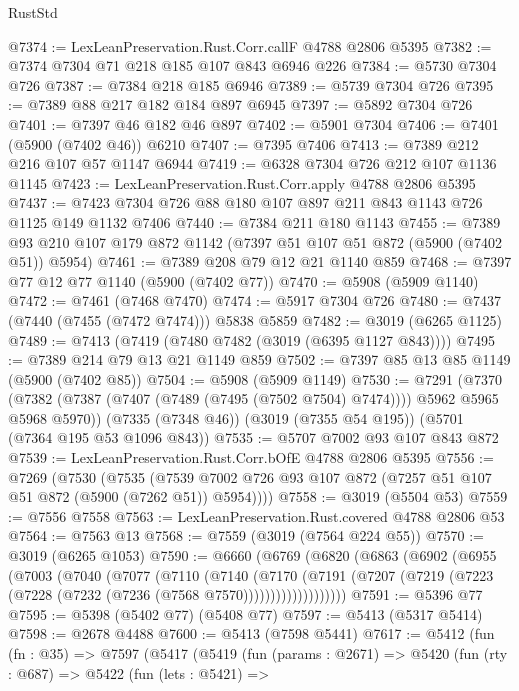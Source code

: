 \begin{lexlean}{RustStd}
\begin{coremodule}
@7374 := LexLeanPreservation.Rust.Corr.callF @4788 @2806 @5395
@7382 := @7374 @7304 @71 @218 @185 @107 @843 @6946 @226
@7384 := @5730 @7304 @726
@7387 := @7384 @218 @185 @6946
@7389 := @5739 @7304 @726
@7395 := @7389 @88 @217 @182 @184 @897 @6945
@7397 := @5892 @7304 @726
@7401 := @7397 @46 @182 @46 @897
@7402 := @5901 @7304
@7406 := @7401 (@5900 (@7402 @46)) @6210
@7407 := @7395 @7406
@7413 := @7389 @212 @216 @107 @57 @1147 @6944
@7419 := @6328 @7304 @726 @212 @107 @1136 @1145
@7423 := LexLeanPreservation.Rust.Corr.apply @4788 @2806 @5395
@7437 := @7423 @7304 @726 @88 @180 @107 @897 @211 @843 @1143 @726 @1125 @149 @1132 @7406
@7440 := @7384 @211 @180 @1143
@7455 := @7389 @93 @210 @107 @179 @872 @1142 (@7397 @51 @107 @51 @872 (@5900 (@7402 @51)) @5954)
@7461 := @7389 @208 @79 @12 @21 @1140 @859
@7468 := @7397 @77 @12 @77 @1140 (@5900 (@7402 @77))
@7470 := @5908 (@5909 @1140)
@7472 := @7461 (@7468 @7470)
@7474 := @5917 @7304 @726
@7480 := @7437 (@7440 (@7455 (@7472 @7474))) @5838 @5859
@7482 := @3019 (@6265 @1125)
@7489 := @7413 (@7419 (@7480 @7482 (@3019 (@6395 @1127 @843))))
@7495 := @7389 @214 @79 @13 @21 @1149 @859
@7502 := @7397 @85 @13 @85 @1149 (@5900 (@7402 @85))
@7504 := @5908 (@5909 @1149)
@7530 := @7291
    (@7370 (@7382 (@7387 (@7407 (@7489 (@7495 (@7502 @7504) @7474)))) @5962 @5965 @5968 @5970))
    (@7335 (@7348 @46))
    (@3019 (@7355 @54 @195))
    (@5701 (@7364 @195 @53 @1096 @843))
@7535 := @5707 @7002 @93 @107 @843 @872
@7539 := LexLeanPreservation.Rust.Corr.bOfE @4788 @2806 @5395
@7556 := @7269
    (@7530
      (@7535 (@7539 @7002 @726 @93 @107 @872 (@7257 @51 @107 @51 @872 (@5900 (@7262 @51)) @5954))))
@7558 := @3019 (@5504 @53)
@7559 := @7556 @7558
@7563 := LexLeanPreservation.Rust.covered @4788 @2806 @53
@7564 := @7563 @13
@7568 := @7559 (@3019 (@7564 @224 @55))
@7570 := @3019 (@6265 @1053)
@7590 := @6660
    (@6769
      (@6820
        (@6863
          (@6902
            (@6955
              (@7003
                (@7040
                  (@7077
                    (@7110
                      (@7140
                        (@7170
                          (@7191
                            (@7207
                              (@7219 (@7223 (@7228 (@7232 (@7236 (@7568 @7570)))))))))))))))))))
@7591 := @5396 @77
@7595 := @5398 (@5402 @77) (@5408 @77)
@7597 := @5413 (@5317 @5414)
@7598 := @2678 @4488
@7600 := @5413 (@7598 @5441)
@7617 := @5412
    (fun (fn : @35) =>
    @7597
      (@5417
        (@5419
          (fun (params : @2671) =>
          @5420
            (fun (rty : @687) =>
            @5422
              (fun (lets : @5421) =>

\end{coremodule}
\end{lexlean}
